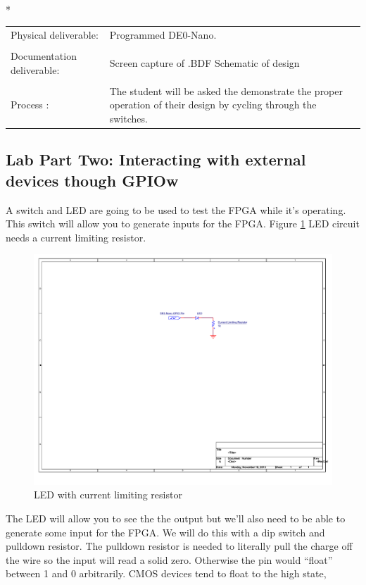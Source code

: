     \vspace{15px}
    \begin{centering}
      \begin{fminipage}{.43\textwidth}
        \vspace{3px}
        \\*
        \vspace{10px}
        \begin{tabular}{p{1.8cm}  p{5.4cm}}
          \raggedright Physical deliverable:        &Programmed DE0-Nano. \\
          \\
          \raggedright Documentation deliverable:   &Screen capture of .BDF Schematic of design\\
          \\
          Process :                                 & The student will be asked the demonstrate the proper operation of their design by cycling through the switches.
        \end{tabular}
      \end{fminipage}
    \end{centering}

    \subsection{Lab Part Two: Interacting with external devices though GPIOw}
      A switch and LED are going to be used to test the FPGA while it's operating. This switch will allow you to generate inputs for the FPGA. Figure \ref{LEDCircuit} LED circuit needs a current limiting resistor.
      \begin{figure}[htpb]
        \label{LEDCircuit}
        \includegraphics[width=.48\textwidth]{Schematics/LED.pdf}
        \caption{LED with current limiting resistor}
      \end{figure}
      The LED will allow you to see the the output but we'll also need to be able to generate some input for the FPGA. We will do this with a dip switch and pulldown resistor. The pulldown resistor is needed to literally pull the charge off the wire so the input will read a solid zero. Otherwise the pin would ``float'' between 1 and 0 arbitrarily. CMOS devices tend to float to the high state, 

